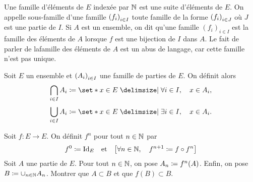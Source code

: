 \documentclass{magnolia}
\begin{document}
\begin{remarques}
\remarque Une famille d'éléments de $E$ indexée par $\mathbb{N}$ est une suite d'éléments de $E$.
\remarque On appelle sous-famille d'une famille $\left(f_i\right)_{i\in I}$ toute famille
  de la forme $\left(f_i\right)_{i\in J}$ où $J$ est une partie de $I$.
\remarque Si $A$ est un ensemble, on dit qu'une famille $(f_i)_{i\in I}$ est la famille des éléments de $A$ lorsque $f$ est une bijection de $I$ dans $A$. Le fait de parler de \og la\fg famille des éléments de $A$ est un abus de langage, car cette famille n'est pas unique.
\end{remarques}


\begin{definition}[utile=-3]
Soit $E$ un ensemble et $\left(A_i\right)_{i\in I}$ une famille de parties de $E$. On
définit alors
\[\bigcap\limits_{i\in I} A_i\defeq \enstq{x\in E}{\forall i\in I \qsep x\in A_i},\]
\[\bigcup\limits_{i\in I} A_i\defeq \enstq{x\in E}{\exists i\in I \qsep x\in A_i}.\]
\end{definition}


\begin{exoUnique}
\exo Soit $f:E\to E$. On définit $f^n$ pour tout $n\in\mathbb{N}$ par
  \[f^0\coloneqq \operatorname{Id}_E \quad\!\text{et}\quad\! \left[\forall n\in\mathbb{N} ,\quad f^{n+1}\coloneqq f\circ f^n\right]\]
  Soit $A$ une partie de $E$. Pour tout $n\in\mathbb{N}$, on pose $A_n\coloneqq f^n(A)$.
  Enfin, on pose $B\coloneqq \cup_{n\in\mathbb{N}} A_n$. Montrer que $A\subset B$ et que
  $f(B)\subset B$.
\end{exoUnique}
\end{document}
